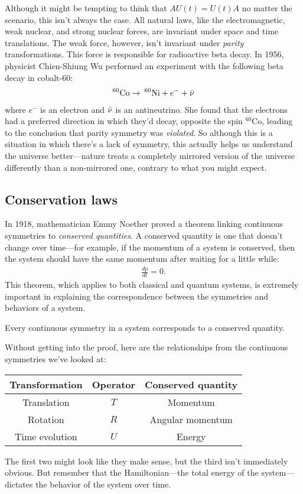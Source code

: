 Although it might be tempting to think that $AU(t) = U(t)A$ no matter the scenario, this isn't always the case. All natural laws, like the electromagnetic, weak nuclear, and strong nuclear forces, are invariant under space and time translations. The weak force, however, isn't invariant under \emph{parity} transformations. This force is responsible for radioactive beta decay. In 1956, physicist Chien-Shiung Wu performed an experiment with the following beta decay in cobalt-60:
\begin{align*}
    ^{60}\text{Co} \rightarrow\: ^{60}\text{Ni} + e^- + \Bar{\nu}
\end{align*}
where $e^-$ is an electron and $\Bar{\nu}$ is an antineutrino. She found that the electrons had a preferred direction in which they'd decay, opposite the spin $^{60}\text{Co}$, leading to the conclusion that parity symmetry was \emph{violated}. So although this is a situation in which there's a lack of symmetry, this actually helps us understand the universe better---nature treats a completely mirrored version of the universe differently than a non-mirrored one, contrary to what you might expect.

\subsection*{Conservation laws}
In 1918, mathematician Emmy Noether proved a theorem linking continuous symmetries to \emph{conserved quantities}. A conserved quantity is one that doesn't change over time---for example, if the momentum of a system is conserved, then the system should have the same momentum after waiting for a little while:
\begin{align*}
    \frac{dp}{dt} = 0.
\end{align*}
This theorem, which applies to both classical and quantum systems, is extremely important in explaining the correspondence between the symmetries and behaviors of a system.
\begin{theorem}
Every continuous symmetry in a system corresponds to a conserved quantity.
\end{theorem}
Without getting into the proof, here are the relationships from the continuous symmetries we've looked at:
\begin{center}
    \begin{tabular}{|c|c|c|}
    \hline
    Transformation & Operator & Conserved quantity \\
    \hline
    Translation & $T$ & Momentum \\
    Rotation & $R$ & Angular momentum \\
    Time evolution & $U$ & Energy \\
    \hline
    \end{tabular}
\end{center}
The first two might look like they make sense, but the third isn't immediately obvious. But remember that the Hamiltonian---the total energy of the system---dictates the behavior of the system over time.

